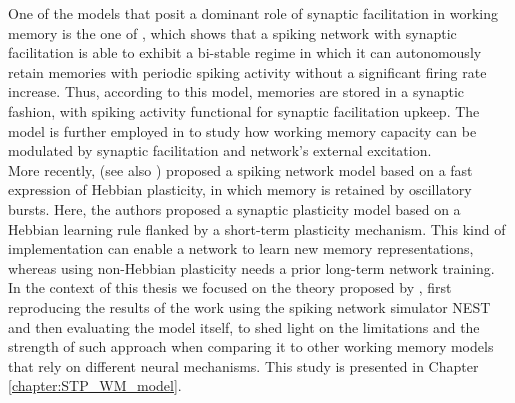 \documentclass[a4paper, 12pt, twoside, openright]{book}
\begin{document}
One of the models that posit a dominant role of synaptic facilitation in working memory is the one of \cite{Mongillo2008}, which shows that a spiking network with synaptic facilitation is able to exhibit a bi-stable regime in which it can autonomously retain memories with periodic spiking activity without a significant firing rate increase. Thus, according to this model, memories are stored in a synaptic fashion, with spiking activity functional for synaptic facilitation upkeep. The model is further employed in \cite{mi_katkov_tsodyks2017} to study how working memory capacity can be modulated by synaptic facilitation and network's external excitation.\\
More recently, \cite{Fiebig2017} (see also \cite{Fiebig2020}) proposed a spiking network model based on a fast expression of Hebbian plasticity, in which memory is retained by oscillatory bursts. Here, the authors proposed a synaptic plasticity model based on a Hebbian learning rule flanked by a short-term plasticity mechanism. This kind of implementation can enable a network to learn new memory representations, whereas using non-Hebbian plasticity needs a prior long-term network training.\\
In the context of this thesis we focused on the theory proposed by \cite{Mongillo2008}, first reproducing the results of the work using the spiking network simulator NEST \cite{Tiddia2022_WM} and then evaluating the model itself, to shed light on the limitations and the strength of such approach when comparing it to other working memory models that rely on different neural mechanisms. This study is presented in Chapter \ref{chapter:STP_WM_model}.
\end{document}
